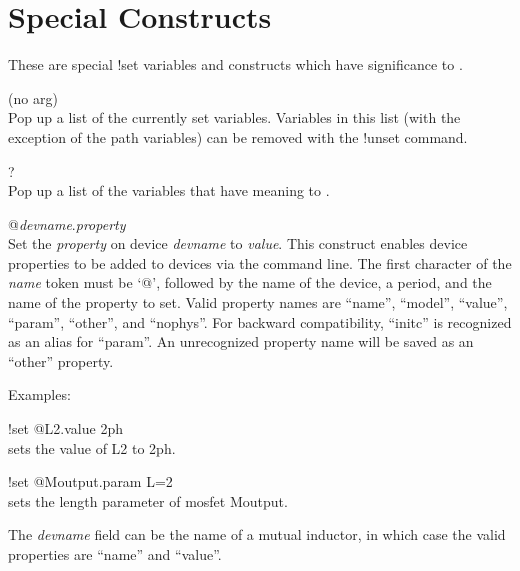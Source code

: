 \section{Special Constructs}

These are special {\cb !set} variables and constructs which have
significance to {\Xic}.

\begin{description}
\item{(no arg)}\\
Pop up a list of the currently set variables.  Variables in this list
(with the exception of the path variables) can be removed with the
{\cb !unset} command.

\item{?}\\
Pop up a list of the variables that have meaning to {\Xic}.

\item{{\vt @}{\it devname\/}.{\it property}}\\
Set the {\it property\/} on device {\it devname} to {\it value\/}. 
This construct enables device properties to be added to devices via
the command line.  The first character of the {\it name} token must be
`{\vt @}', followed by the name of the device, a period, and the name
of the property to set.  Valid property names are ``{\vt name}'',
``{\vt model}'', ``{\vt value}'', ``{\vt param}'', ``{\vt other}'',
and ``{\vt nophys}''.  For backward compatibility, ``{\vt initc}'' is
recognized as an alias for ``{\vt param}''.  An unrecognized property
name will be saved as an ``other'' property.

Examples:
\begin{description}
\item{\vt !set @L2.value 2ph}\\
sets the value of L2 to 2ph.
\item{\vt !set @Moutput.param L=2}\\
sets the length parameter of mosfet {\vt Moutput}.
\end{description}

The {\it devname} field can be the name of a mutual inductor, in which
case the valid properties are ``{\vt name}'' and ``{\vt value}''.
\end{description}



